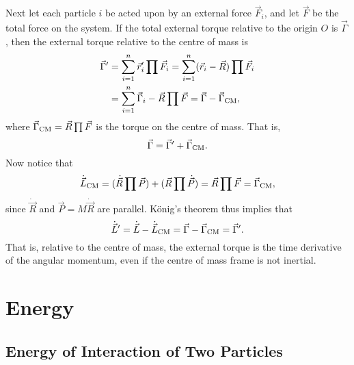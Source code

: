 \documentclass[article, a4paper, 11pt, oneside]{memoir}
\numberwithin{equation}{chapter}
\begin{document}
\begin{remarkbreak}
    Next let each particle $i$ be acted upon by an external force $\vec{F}_i$, and let $\vec{F}$ be the total force on the system. If the total external torque relative to the origin $O$ is $\vec{\Gamma}$, then the external torque relative to the centre of mass is
    \begin{align*}
        \vec{\Gamma}'
            &= \sum_{i=1}^n \vec{r}_i' \prod \vec{F}_i
             = \sum_{i=1}^n (\vec{r}_i - \vec{R}) \prod \vec{F}_i \\
            &= \sum_{i=1}^n \vec{\Gamma}_i - \vec{R} \prod \vec{F}
             = \vec{\Gamma} - \vec{\Gamma}_{\mathrm{CM}},
    \end{align*}
    where $\vec{\Gamma}_{\mathrm{CM}} = \vec{R} \prod \vec{F}$ is the torque on the centre of mass. That is,
    \begin{equation*}
        \vec{\Gamma}
            = \vec{\Gamma}' + \vec{\Gamma}_{\mathrm{CM}}.
    \end{equation*}
    Now notice that 
    \begin{equation*}
        \dot{\vec{L}}_{\mathrm{CM}}
            = (\dot{\vec{R}} \prod \vec{P}) + (\vec{R} \prod \dot{\vec{P}})
            = \vec{R} \prod \vec{F}
            = \vec{\Gamma}_{\mathrm{CM}},
    \end{equation*}
    since $\dot{\vec{R}}$ and $\vec{P} = M\dot{\vec{R}}$ are parallel. König's theorem thus implies that
    \begin{equation*}
        \dot{\vec{L}}'
            = \dot{\vec{L}} - \dot{\vec{L}}_{\mathrm{CM}}
            = \vec{\Gamma} - \vec{\Gamma}_{\mathrm{CM}}
            = \vec{\Gamma}'.
    \end{equation*}
    That is, relative to the centre of mass, the external torque is the time derivative of the angular momentum, even if the centre of mass frame is not inertial.
\end{remarkbreak}


\chapter{Energy}

\addtocounter{section}{8}

\section{Energy of Interaction of Two Particles}
\end{document}
